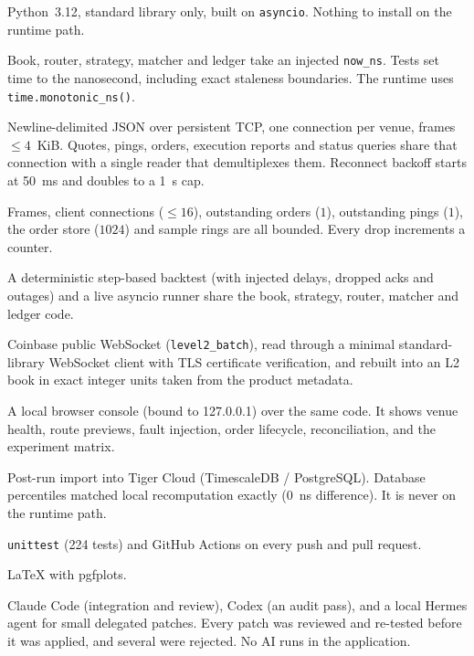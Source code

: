 \documentclass[11pt]{article}
\theoremstyle{remark}
\newcommand{\code}[1]{\texttt{#1}}
\begin{document}
\begin{description}[leftmargin=1.5em, style=nextline, itemsep=2pt]
  \item[Language and dependencies] Python~3.12, standard library only, built on
        \code{asyncio}. Nothing to install on the runtime path.
  \item[Pure, clock-free core] Book, router, strategy, matcher and ledger take an injected
        \code{now\_ns}. Tests set time to the nanosecond, including exact staleness boundaries.
        The runtime uses \code{time.monotonic\_ns()}.
  \item[Transport] Newline-delimited JSON over persistent TCP, one connection per venue,
        frames $\le 4$~KiB. Quotes, pings, orders, execution reports and status queries share
        that connection with a single reader that demultiplexes them. Reconnect backoff starts
        at 50~ms and doubles to a 1~s cap.
  \item[Bounded memory] Frames, client connections ($\le 16$), outstanding orders ($1$),
        outstanding pings ($1$), the order store ($1024$) and sample rings are all bounded.
        Every drop increments a counter.
  \item[Two harnesses, one logic] A deterministic step-based backtest (with injected delays,
        dropped acks and outages) and a live asyncio runner share the book, strategy, router,
        matcher and ledger code.
  \item[Real data] Coinbase public WebSocket (\code{level2\_batch}), read through a minimal
        standard-library WebSocket client with TLS certificate verification, and rebuilt into
        an L2 book in exact integer units taken from the product metadata.
  \item[Operations console] A local browser console (bound to 127.0.0.1) over the same code.
        It shows venue health, route previews, fault injection, order lifecycle,
        reconciliation, and the experiment matrix.
  \item[Optional analytics] Post-run import into Tiger Cloud (TimescaleDB / PostgreSQL).
        Database percentiles matched local recomputation exactly (0~ns difference). It is never
        on the runtime path.
  \item[Testing and CI] \code{unittest} (224 tests) and GitHub Actions on every push and pull
        request.
  \item[Paper] \LaTeX{} with pgfplots.
  \item[Development tools] Claude Code (integration and review), Codex (an audit pass), and a
        local Hermes agent for small delegated patches. Every patch was reviewed and re-tested
        before it was applied, and several were rejected. No AI runs in the application.
\end{description}
\end{document}
